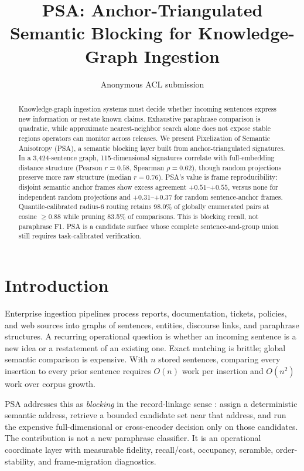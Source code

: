 \documentclass[11pt]{article}
\title{PSA: Anchor-Triangulated Semantic Blocking for Knowledge-Graph Ingestion}
\author{Anonymous ACL submission}
\begin{document}
\maketitle

\begin{abstract}
Knowledge-graph ingestion systems must decide whether incoming sentences express new information or restate known claims. Exhaustive paraphrase comparison is quadratic, while approximate nearest-neighbor search alone does not expose stable regions operators can monitor across releases. We present Pixelization of Semantic Anisotropy (PSA), a semantic blocking layer built from anchor-triangulated signatures. In a 3,424-sentence graph, 115-dimensional signatures correlate with full-embedding distance structure (Pearson $r=0.58$, Spearman $\rho=0.62$), though random projections preserve more raw structure (median $r=0.76$). PSA's value is frame reproducibility: disjoint semantic anchor frames show excess agreement $+0.51$--$+0.55$, versus none for independent random projections and $+0.31$--$+0.37$ for random sentence-anchor frames. Quantile-calibrated radius-6 routing retains 98.0\% of globally enumerated pairs at cosine $\geq0.88$ while pruning 83.5\% of comparisons. This is blocking recall, not paraphrase F1. PSA is a candidate surface whose complete sentence-and-group union still requires task-calibrated verification.
\end{abstract}

\section{Introduction}

Enterprise ingestion pipelines process reports, documentation, tickets, policies, and web sources into graphs of sentences, entities, discourse links, and paraphrase structures. A recurring operational question is whether an incoming sentence is a new idea or a restatement of an existing one. Exact matching is brittle; global semantic comparison is expensive. With $n$ stored sentences, comparing every insertion to every prior sentence requires $O(n)$ work per insertion and $O(n^2)$ work over corpus growth.

PSA addresses this as \emph{blocking} in the record-linkage sense \citep{fellegi1969record,christen2012data}: assign a deterministic semantic address, retrieve a bounded candidate set near that address, and run the expensive full-dimensional or cross-encoder decision only on those candidates. The contribution is not a new paraphrase classifier. It is an operational coordinate layer with measurable fidelity, recall/cost, occupancy, scramble, order-stability, and frame-migration diagnostics.
\end{document}

